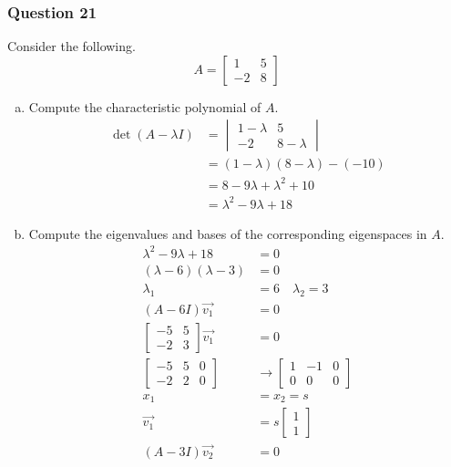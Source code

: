 \documentclass{math}
\begin{document}
\subsubsection*{Question 21}
Consider the following.
\[ A = \begin{bmatrix}1 & 5 \\ -2 & 8\end{bmatrix} \]
\begin{enumerate}[(a)]
  \item Compute the characteristic polynomial of \( A \).
  \begin{align*}
    \det(A-\lambda I) &= \begin{vmatrix}
      1-\lambda & 5 \\
      -2 & 8-\lambda
    \end{vmatrix} \\
    &= (1-\lambda)(8-\lambda)-(-10) \\
    &= 8-9\lambda+\lambda^2+10 \\
    &= \lambda^2-9\lambda+18
  \end{align*}
  \item Compute the eigenvalues and bases of the corresponding eigenspaces in
    \( A \).
  \begin{align*}
    \lambda^2-9\lambda+18 &= 0 \\
    (\lambda-6)(\lambda-3) &= 0 \\
    \lambda_1 &= 6 \quad \lambda_2 = 3 \\
    (A-6I)\vec{v_1} &= 0 \\
    \begin{bmatrix}
      -5 & 5 \\
      -2 & 3
    \end{bmatrix}\vec{v_1} &= 0 \\
    \begin{bmatrix}
      -5 & 5 & 0 \\
      -2 & 2 & 0
    \end{bmatrix} &\to \begin{bmatrix}
      1 & -1 & 0 \\
      0 & 0 & 0
    \end{bmatrix} \\
    x_1 &= x_2 = s \\
    \vec{v_1} &= s\begin{bmatrix}1 \\ 1\end{bmatrix} \\
    (A-3I)\vec{v_2} &= 0 \\

\end{align*}
\end{enumerate}
\end{document}
